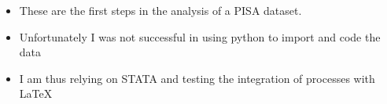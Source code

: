 \documentclass{beamer}
\begin{document}
\begin{frame}
\begin{itemize}
\item These are the first steps in the analysis of a PISA dataset.
\item Unfortunately I was not successful in using python to import and code the data
\item I am thus relying on STATA and testing the integration of processes with LaTeX
\end{itemize}
\end{frame}

\begin{frame}

\end{frame}
\end{document}
